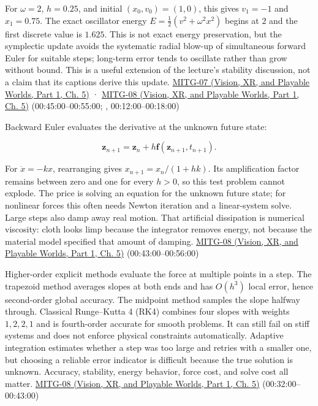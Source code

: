 For \(\omega=2\), \(h=0.25\), and initial \((x_0,v_0)=(1,0)\), this gives \(v_1=-1\) and \(x_1=0.75\). The exact oscillator energy \(E=\frac12(v^2+\omega^2x^2)\) begins at \(2\) and the first discrete value is \(1.625\). This is not exact energy preservation, but the symplectic update avoids the systematic radial blow-up of simultaneous forward Euler for suitable steps; long-term error tends to oscillate rather than grow without bound. This is a useful extension of the lecture's stability discussion, not a claim that its captions derive this update. \href{../07-Vision-XR-and-Playable-Worlds-P01/main.pdf\#nameddest=04-visual-computing-ii-ch036-mitg-07---particle-systems}{MITG-07 (Vision, XR, and Playable Worlds, Part 1, Ch. 5)} · \href{../07-Vision-XR-and-Playable-Worlds-P01/main.pdf\#nameddest=04-visual-computing-ii-ch036-mitg-08---cloth-simulation}{MITG-08 (Vision, XR, and Playable Worlds, Part 1, Ch. 5)} (00:45:00--00:55:00; , 00:12:00--00:18:00)

Backward Euler evaluates the derivative at the unknown future state:

\[
\boldsymbol{z}_{n+1}=\boldsymbol{z}_n+h\boldsymbol{f}(\boldsymbol{z}_{n+1},t_{n+1}).
\]

For \(\dot{x}=-kx\), rearranging gives \(x_{n+1}=x_n/(1+hk)\). Its amplification factor remains between zero and one for every \(h>0\), so this test problem cannot explode. The price is solving an equation for the unknown future state; for nonlinear forces this often needs Newton iteration and a linear-system solve. Large steps also damp away real motion. That artificial dissipation is numerical viscosity: cloth looks limp because the integrator removes energy, not because the material model specified that amount of damping. \href{../07-Vision-XR-and-Playable-Worlds-P01/main.pdf\#nameddest=04-visual-computing-ii-ch036-mitg-08---cloth-simulation}{MITG-08 (Vision, XR, and Playable Worlds, Part 1, Ch. 5)} (00:43:00--00:56:00)

Higher-order explicit methods evaluate the force at multiple points in a step. The trapezoid method averages slopes at both ends and has \(O(h^3)\) local error, hence second-order global accuracy. The midpoint method samples the slope halfway through. Classical Runge--Kutta 4 (RK4) combines four slopes with weights \(1,2,2,1\) and is fourth-order accurate for smooth problems. It can still fail on stiff systems and does not enforce physical constraints automatically. Adaptive integration estimates whether a step was too large and retries with a smaller one, but choosing a reliable error indicator is difficult because the true solution is unknown. Accuracy, stability, energy behavior, force cost, and solve cost all matter. \href{../07-Vision-XR-and-Playable-Worlds-P01/main.pdf\#nameddest=04-visual-computing-ii-ch036-mitg-08---cloth-simulation}{MITG-08 (Vision, XR, and Playable Worlds, Part 1, Ch. 5)} (00:32:00--00:43:00)

